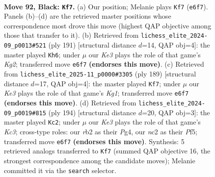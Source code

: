 \documentclass[11pt]{article}
\begin{document}
\clearpage

\begin{figure}[p]\centering
\begin{subfigure}{0.46\textwidth}\centering
\resizebox{\linewidth}{!}{%
\newchessgame
\chessboard[
  setfen={8/6p1/4kp2/7p/7P/6P1/1RNr4/5K2 b - - 9 92},
  showmover=false,
  pgfstyle=straightmove, color=movearrow, markmove={e6-f7}
]}
\caption{}
\end{subfigure}\hfill
\begin{subfigure}{0.46\textwidth}\centering
\resizebox{\linewidth}{!}{%
\newchessgame
\chessboard[
  setfen={R7/6k1/6p1/7p/7P/5PP1/1r6/5K2 b - - 2 96},
  showmover=false,
  pgfstyle=straightmove, color=movearrow, markmove={g7-h6}
]}
\caption{}
\end{subfigure}
\\[4pt]
\begin{subfigure}{0.46\textwidth}\centering
\resizebox{\linewidth}{!}{%
\newchessgame
\chessboard[
  setfen={R5k1/6p1/7p/7P/6P1/1r6/5K2/8 b - - 46 95},
  showmover=false,
  pgfstyle=straightmove, color=movearrow, markmove={g8-f7}
]}
\caption{}
\end{subfigure}\hfill
\begin{subfigure}{0.46\textwidth}\centering
\resizebox{\linewidth}{!}{%
\newchessgame
\chessboard[
  setfen={5k2/8/3p4/p4Pp1/P1P2pP1/2K5/8/8 w - - 43 98},
  showmover=false,
  pgfstyle=straightmove, color=movearrow, markmove={c3-c2}
]}
\caption{}
\end{subfigure}
\caption{\textbf{Move 92, Black: \texttt{Kf7}.} (a) Our position; Melanie plays \texttt{Kf7} (\texttt{e6f7}). Panels (b)--(d) are the retrieved master positions whose correspondence most drove this move (highest QAP objective among those that transfer to it). (b) Retrieved from \texttt{lichess\_elite\_2024-09\_p0013\#521} (ply 191) [structural distance $d$=14, QAP obj=4]: the master played \texttt{Kh6}; under $\mu$ our \emph{Ke3} plays the role of that game's \emph{Kg2}; transferred move \texttt{e6f7} \textbf{(endorses this move)}. (c) Retrieved from \texttt{lichess\_elite\_2025-11\_p0000\#3305} (ply 189) [structural distance $d$=17, QAP obj=4]: the master played \texttt{Kf7}; under $\mu$ our \emph{Ke3} plays the role of that game's \emph{Kg1}; transferred move \texttt{e6f7} \textbf{(endorses this move)}. (d) Retrieved from \texttt{lichess\_elite\_2024-09\_p0019\#815} (ply 194) [structural distance $d$=20, QAP obj=3]: the master played \texttt{Kc2}; under $\mu$ our \emph{Ke3} plays the role of that game's \emph{Kc3}; cross-type roles: our \emph{r}b2 as their \emph{P}g4, our \emph{n}c2 as their \emph{P}f5; transferred move \texttt{e6f7} \textbf{(endorses this move)}. Synthesis: 5 retrieved analogs transferred to \texttt{Kf7} (summed QAP objective 16, the strongest correspondence among the candidate moves); Melanie committed it via the \texttt{search} selector.}
\label{fig:thought-m183}
\end{figure}
\end{document}
